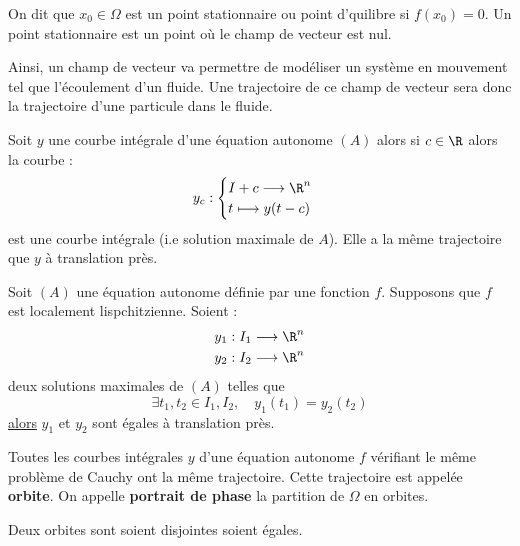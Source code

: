 \begin{definition}
    On dit que $ x_0 \in \Omega$ est un point stationnaire ou point d'quilibre si $f(x_0) = 0$. 
    Un point stationnaire est un point où le champ de vecteur est nul. 
\end{definition}

Ainsi, un champ de vecteur va permettre de modéliser un système en mouvement tel que l'écoulement d'un fluide. 
Une trajectoire de ce champ de vecteur sera donc la trajectoire d'une particule dans le fluide. 

\begin{proposition}
    Soit $y$ une courbe intégrale d'une équation autonome $(A)$ alors si $c \in \R$ alors la courbe :
        \[ y_c : 
            \begin{cases}
                I + c \longrightarrow \R^n \\ 
                t \longmapsto y(t - c)
            \end{cases} \] 
    est une courbe intégrale (i.e solution maximale de $A$). Elle a la même trajectoire que $y$ à translation près. 
\end{proposition}

\begin{proposition}
    Soit $(A)$ une équation autonome définie par une fonction $f$. Supposons que $f$ est localement lispchitzienne. 
    Soient :
        \begin{align*}
            y_1 : I_1 \longrightarrow \R^n \\ 
            y_2 : I_2 \longrightarrow \R^n 
        \end{align*}
    deux solutions maximales de $(A)$ telles que 
        \[ \exists t_1, t_2 \in I_1, I_2, \quad y_1(t_1) = y_2(t_2) \] 
    \underline{alors} $y_1$ et $y_2$ sont égales à translation près. 
\end{proposition}

\begin{definition}[Orbite]
    Toutes les courbes intégrales $y$ d'une équation autonome $f$ vérifiant le même problème de Cauchy ont la même trajectoire. 
    Cette trajectoire est appelée \textbf{orbite}. 
    On appelle \textbf{portrait de phase} la partition de $\Omega$ en orbites.  
\end{definition}

\begin{prop}[Orbites]
    Deux orbites sont soient disjointes soient égales. 
\end{prop}

